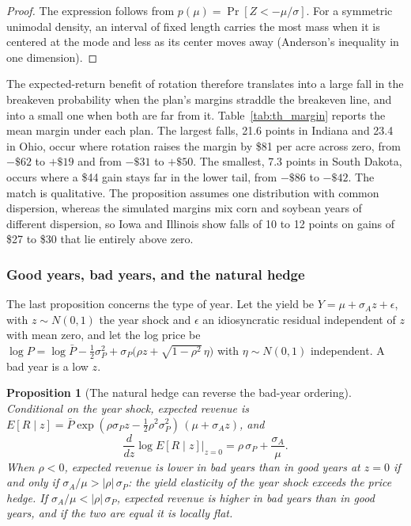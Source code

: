 \documentclass[11pt,letterpaper]{article}
\newtheorem{theorem}{Proposition}
\theoremstyle{remark}
\begin{document}
\begin{proof}
The expression follows from $p(\mu)=\Pr[Z<-\mu/\sigma]$. For a symmetric unimodal density, an interval of fixed length carries the most mass when it is centered at the mode and less as its center moves away (Anderson's inequality in one dimension).
\end{proof}

The expected-return benefit of rotation therefore translates into a large fall in the breakeven probability when the plan's margins straddle the breakeven line, and into a small one when both are far from it. Table~\ref{tab:th_margin} reports the mean margin under each plan. The largest falls, 21.6 points in Indiana and 23.4 in Ohio, occur where rotation raises the margin by \$81 per acre across zero, from $-\$62$ to $+\$19$ and from $-\$31$ to $+\$50$. The smallest, 7.3 points in South Dakota, occurs where a \$44 gain stays far in the lower tail, from $-\$86$ to $-\$42$. The match is qualitative. The proposition assumes one distribution with common dispersion, whereas the simulated margins mix corn and soybean years of different dispersion, so Iowa and Illinois show falls of 10 to 12 points on gains of \$27 to \$30 that lie entirely above zero.

\begin{table}[H]
\centering
\caption{Mean net return (\$ per acre per year) under continuous corn and strict alternation, the gain from rotation, and the fall in the annual breakeven probability, medium NCCPI zone.}
\label{tab:th_margin}

\end{table}

\subsubsection{\label{subsubsec:proposition_4}Good years, bad years, and the natural hedge}

The last proposition concerns the type of year. Let the yield be $Y=\mu+\sigma_A z+\epsilon$, with $z\sim N(0,1)$ the year shock and $\epsilon$ an idiosyncratic residual independent of $z$ with mean zero, and let the log price be $\log P=\log\bar P-\tfrac12\sigma_P^2+\sigma_P\big(\rho z+\sqrt{1-\rho^2}\,\eta\big)$ with $\eta\sim N(0,1)$ independent. A bad year is a low $z$.

\begin{theorem}[The natural hedge can reverse the bad-year ordering]
\label{prop:hedge}
Conditional on the year shock, expected revenue is $E[R\mid z]=\bar P\exp(\rho\sigma_Pz-\tfrac12\rho^2\sigma_P^2)\,(\mu+\sigma_Az)$, and
\begin{equation}
\frac{d}{dz}\log E[R\mid z]\Big|_{z=0}=\rho\,\sigma_P+\frac{\sigma_A}{\mu}.
\end{equation}
When $\rho<0$, expected revenue is lower in bad years than in good years at $z=0$ if and only if $\sigma_A/\mu>|\rho|\,\sigma_P$: the yield elasticity of the year shock exceeds the price hedge. If $\sigma_A/\mu<|\rho|\,\sigma_P$, expected revenue is higher in bad years than in good years, and if the two are equal it is locally flat.
\end{theorem}
\end{document}
